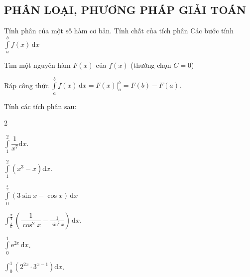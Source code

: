 \subsection{PHÂN LOẠI, PHƯƠNG PHÁP GIẢI TOÁN}
\begin{dang}{Tính phân của một số hàm cơ bản. Tính chất của tích phân}
	Các bước tính $\displaystyle\int\limits_a^b f(x)\mathrm{\,d}x$
	\begin{listEX}[1]
		\item [\ding{172}] Tìm một nguyên hàm $F(x)$ của $f(x)$ (thường chọn $C=0$)
		\item [\ding{173}] Ráp công thức $\displaystyle\int\limits_a^b f(x)\mathrm{\,d}x=F(x)\bigg|_a^b=F(b)-F(a).$
	\end{listEX}
\end{dang}
\setcounter{vd}{0}
\begin{vd}
	Tính các tích phân sau:
	\begin{enumEX}[a)]{2}
		\item $\displaystyle \int\limits_1^2 \dfrac{1}{x^7} \mathrm{d}x$.
		\item $\displaystyle \int\limits_1^2 (x^3-x) \mathrm{d}x$.
		\item $\displaystyle\int\limits_0^{\tfrac{\pi}{2}}(3 \sin x-\cos x) \mathrm{\,d}x$
		\item $\displaystyle\int_{\frac{\pi}{6}}^{\frac{\pi}{4}}\left(\dfrac{1}{\cos ^2 x}-\frac{1}{\sin ^2 x}\right) \mathrm{\,d} x$.
		\item $\displaystyle \int \limits_0^1 \mathrm{e}^{2 x}\mathrm{\,d}x$.
		\item $\displaystyle\int_0^1\left(2^{2 x} \cdot 3^{x-1}\right) \mathrm{d} x$.
	\end{enumEX}
\end{vd}

